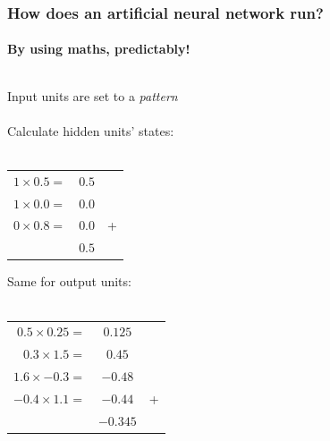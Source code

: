 \documentclass{beamer}
\begin{document}
\begin{frame}
\frametitle{How does an artificial neural network run?}
\framesubtitle{By using maths, predictably!}
  \begin{columns}[T]
    \begin{column}{.5\textwidth}
Input units are set to a \emph{pattern} \\
\ \\
Calculate hidden units' states: \\
\ \\
\begin{tabular}{r S[tabformat=3.2] r}%
 $1 \times 0.5 =$ & $0.5$ &\\
 $1 \times 0.0 =$ & $0.0$ &\\
 $0 \times 0.8 =$ & $0.0$ & +\\
 \hline
 & $0.5$ &
\end{tabular}

Same for output units: \\
\ \\
\begin{tabular}{r S[tabformat=3.2] r}%
 $0.5 \times 0.25 =$ & $0.125$ &\\
 $0.3 \times 1.5  =$ & $0.45$ &\\
 $1.6 \times -0.3 =$ & $-0.48$ &\\
 $-0.4 \times 1.1 =$ & $-0.44$ & + \\
 \hline
 & $-0.345$ & 
\end{tabular}
    \end{column}
    \begin{column}{.5\textwidth}


\end{column}
\end{columns}
\end{frame}
\end{document}
